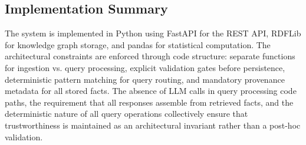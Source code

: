 \subsection{Implementation Summary}

The system is implemented in Python using FastAPI for the REST API, RDFLib for knowledge graph storage, and pandas for statistical computation. The architectural constraints are enforced through code structure: separate functions for ingestion vs. query processing, explicit validation gates before persistence, deterministic pattern matching for query routing, and mandatory provenance metadata for all stored facts. The absence of LLM calls in query processing code paths, the requirement that all responses assemble from retrieved facts, and the deterministic nature of all query operations collectively ensure that trustworthiness is maintained as an architectural invariant rather than a post-hoc validation.

